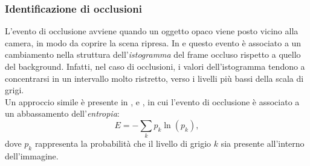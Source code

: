 \subsubsection{Identificazione di occlusioni}
L'evento di occlusione avviene quando un oggetto opaco viene posto vicino alla camera, in modo da coprire la scena ripresa.
In \cite{aksay2007camera} e \cite{saglam2009real} questo evento \`e associato a un cambiamento nella struttura dell'\textit{istogramma} del frame occluso rispetto a quello del background.
Infatti, nel caso di occlusioni, i valori dell'istogramma tendono a concentrarsi in un intervallo molto ristretto, verso i livelli pi\`u bassi della scala di grigi.\\
Un approccio simile \`e presente in \cite{harasse2004automated}, \cite{gil2007automatic} e \cite{ellwart2012camera}, in cui l'evento di occlusione \`e associato a un abbassamento dell'\textit{entropia}:
 \begin{equation}
 \label{eq:entropy}
 E=-\sum_{k}p_k\ln(p_k) ,
 \end{equation}
 dove $p_k$ rappresenta la probabilit\`a che il livello di grigio $k$ sia presente all'interno dell'immagine. 
